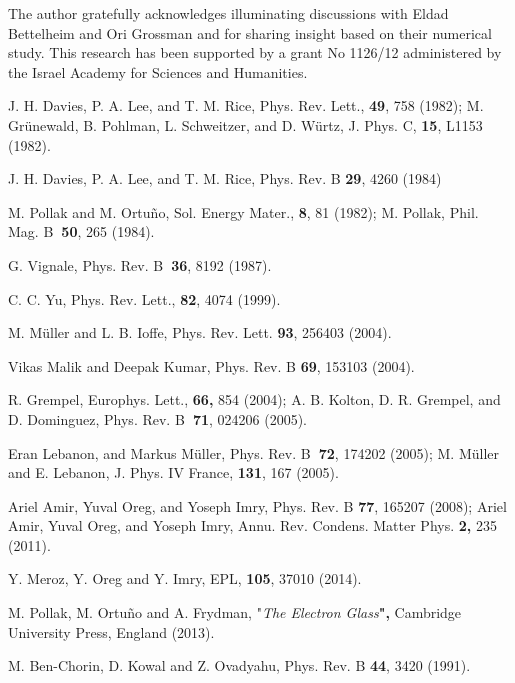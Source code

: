 \documentclass
[preprint,showpacs,byrevtex,10pt,twocolumn,tightenlines,prl,letterpaper]{revtex4}%
\begin{document}
\begin{acknowledgments}
The author gratefully acknowledges illuminating discussions with Eldad
Bettelheim and Ori Grossman and for sharing insight based on their numerical
study. This research has been supported by a grant No 1126/12 administered by
the Israel Academy for Sciences and Humanities.
\end{acknowledgments}

\begin{thebibliography}{99}                                                                                               %


J. H. Davies, P. A. Lee, and T. M. Rice, Phys. Rev. Lett.,
\textbf{49}, 758 (1982); M. Gr\"{u}newald, B. Pohlman, L. Schweitzer, and D.
W\"{u}rtz, J. Phys. C, \textbf{15}, L1153 (1982).

J. H. Davies, P. A. Lee, and T. M. Rice, Phys. Rev. B \textbf{29},
4260 (1984)

M. Pollak and M. Ortu\~{n}o, Sol. Energy Mater., \textbf{8}, 81
(1982); M. Pollak, Phil. Mag. B\textbf{\ 50}, 265 (1984).

G. Vignale, Phys. Rev. B\textbf{\ 36}, 8192 (1987).

C. C. Yu, Phys. Rev. Lett., \textbf{82}, 4074 (1999).

M. M\"{u}ller and L. B. Ioffe, Phys. Rev. Lett. \textbf{93},
256403 (2004).

Vikas Malik and Deepak Kumar, Phys. Rev. B \textbf{69}, 153103 (2004).

R. Grempel, Europhys. Lett., \textbf{66,} 854 (2004); A. B.
Kolton, D. R. Grempel, and D. Dominguez, Phys. Rev. B\textbf{\ 71}, 024206 (2005).

Eran Lebanon, and Markus M\"{u}ller, Phys. Rev. B\textbf{\ 72},
174202 (2005); M. M\"{u}ller and E. Lebanon, J. Phys. IV France, \textbf{131},
167 (2005).

Ariel Amir, Yuval Oreg, and Yoseph Imry, Phys. Rev. B
\textbf{77}, 165207 (2008); Ariel Amir, Yuval Oreg, and Yoseph Imry, Annu.
Rev. Condens. Matter Phys. \textbf{2,} 235 (2011).

Y. Meroz, Y. Oreg and Y. Imry, EPL, \textbf{105}, 37010 (2014).

M. Pollak, M. Ortu\~{n}o and A. Frydman, "\textit{The Electron
Glass}\textbf{",} Cambridge University Press, England (2013).

M. Ben-Chorin, D. Kowal and Z. Ovadyahu, Phys. Rev. B
\textbf{44}, 3420 (1991).


\end{thebibliography}
\end{document}
